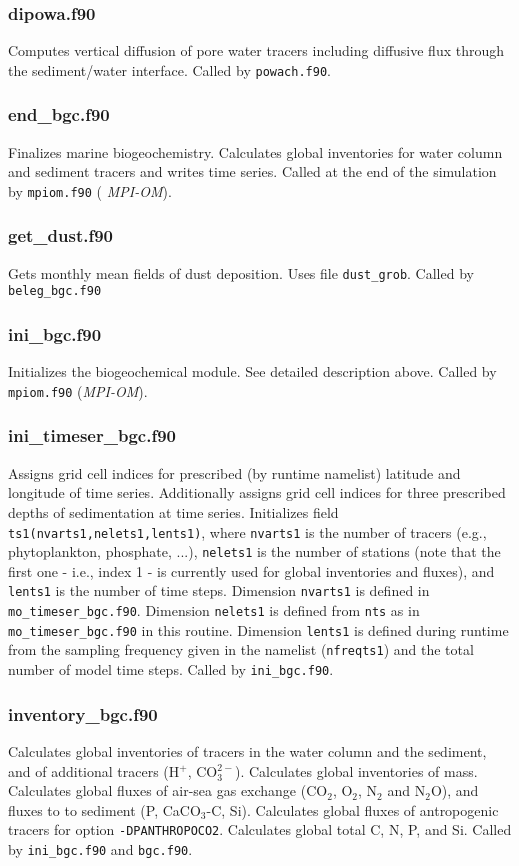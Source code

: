 \documentclass[11pt,a4paper,fleqn,twoside]{article}
\begin{document}
\subsubsection{dipowa.f90} Computes vertical diffusion of pore water tracers
including diffusive flux through the sediment/water interface.
Called by {\tt powach.f90}.

\subsubsection{end\_bgc.f90} Finalizes marine biogeochemistry.
Calculates global inventories for water column and sediment tracers and writes
time series. Called at the end of the simulation by {\tt mpiom.f90} ({\em
MPI-OM}). 

\subsubsection{get\_dust.f90} Gets monthly mean fields of dust deposition. Uses
file {\tt dust\_grob}. Called by {\tt beleg\_bgc.f90}

\subsubsection{ini\_bgc.f90} Initializes the biogeochemical module. See
detailed description above. Called by {\tt mpiom.f90} ({\em MPI-OM}).

\subsubsection{ini\_timeser\_bgc.f90} Assigns grid cell indices for prescribed (by
runtime namelist) latitude and longitude of time series. Additionally assigns 
grid cell indices for three prescribed depths of sedimentation at time series. 
Initializes field {\tt ts1(nvarts1,nelets1,lents1)}, where {\tt nvarts1} is the
number of tracers (e.g., phytoplankton, phosphate, ...), {\tt nelets1} is the
number of stations (note that the first one - i.e., index 1 - is currently used
for global inventories and fluxes), and {\tt lents1} is the number of time
steps. Dimension {\tt nvarts1} is defined in {\tt mo\_timeser\_bgc.f90}.
Dimension {\tt nelets1} is defined from {\tt nts}  as in {\tt
mo\_timeser\_bgc.f90} in this routine. Dimension {\tt lents1} is defined during
runtime from the sampling frequency given in the namelist ({\tt nfreqts1}) and
the total number of model time steps. Called by {\tt ini\_bgc.f90}.

\subsubsection{inventory\_bgc.f90} Calculates global inventories of tracers in
the water column and the sediment, and of additional tracers (H$^+$,
CO$^{2-}_3$).  Calculates global inventories of mass. Calculates global fluxes of
air-sea gas exchange (CO$_2$, O$_2$, N$_2$ and N$_2$O), and fluxes to to
sediment (P, CaCO$_3$-C, Si). Calculates global fluxes of antropogenic tracers
for option {\tt -DPANTHROPOCO2}. Calculates global total C, N, P, and Si. Called
by {\tt ini\_bgc.f90} and {\tt  bgc.f90}.
\end{document}
